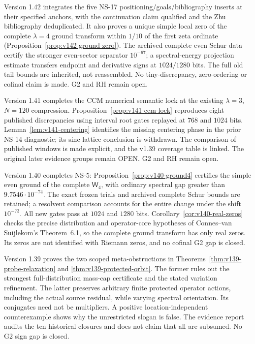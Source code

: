 \documentclass[11pt]{article}
\theoremstyle{remark}
\begin{document}
Version 1.42 integrates the five NS-17 positioning/goals/bibliography
inserts at their specified anchors, with the continuation claim qualified
and the Zhu bibliography deduplicated. It also proves a unique simple local zero of the complete
$\lambda=4$ ground transform within $1/10$ of the first zeta ordinate
(Proposition~\ref{prop:v142-ground-zero}). The archived complete even
Schur data certify the stronger even-sector separator $10^{-67}$;
a spectral-energy projection estimate transfers endpoint and derivative
signs at $1024/1280$ bits. The full old tail bounds are inherited,
not reassembled. No tiny-discrepancy, zero-ordering or cofinal claim
is made. G2 and RH remain open.

Version 1.41 completes the CCM numerical semantic lock at the existing
$\lambda=3$, $N=120$ compression. Proposition~\ref{prop:v141-ccm-lock}
reproduces eight published discrepancies using interval root gates
replayed at $768$ and $1024$ bits. Lemma~\ref{lem:v141-centering}
identifies the missing centering phase in the prior NS-14 diagnostic;
its sinc-lattice conclusion is withdrawn. The comparison of published
windows is made explicit, and the v1.39 coverage table is linked.
The original later evidence groups remain OPEN. G2 and RH remain open.

Version 1.40 completes NS-5: Proposition~\ref{prop:v140-ground4}
certifies the simple even ground of the complete $\mathsf W_4$,
with ordinary spectral gap greater than $9.7546\cdot10^{-74}$.
The exact frozen trials and archived complete Schur bounds are retained;
a resolvent comparison accounts for the entire change under the shift
$10^{-73}$. All new gates pass at $1024$ and $1280$ bits.
Corollary~\ref{cor:v140-real-zeros} checks the precise distribution
and operator-core hypotheses of Connes--van Suijlekom's Theorem~6.1,
so the complete ground transform has only real zeros. Its zeros are
not identified with Riemann zeros, and no cofinal G2 gap is closed.

Version 1.39 proves the two scoped meta-obstructions in
Theorems~\ref{thm:v139-probe-relaxation} and
\ref{thm:v139-protected-orbit}. The former rules out the strongest
full-distribution mass-cap certificate and the stated variation
refinement. The latter preserves arbitrary finite protected operator
actions, including the actual source residual, while varying spectral
orientation. Its conjugates need not be multipliers. A positive
location-independent counterexample shows why the unrestricted slogan
is false. The evidence report audits the ten historical closures and
does not claim that all are subsumed. No G2 sign gap is closed.
\end{document}
